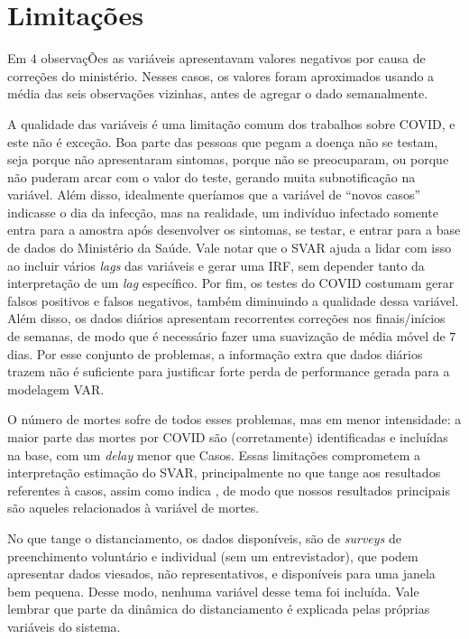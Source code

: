 \documentclass[
    article,
	12pt,				%
	oneside,			%
	a4paper,			%
	english,			%
	brazil,				%
	hyperref = {colorlinks, citecolor=c1d, linkcolor=c2d, urlcolor=c3d, colorlinks}
	]{abntex2}
\newcounter{j}
\begin{document}
\section{Limitações}

Em $4$ observaçÕes as variáveis apresentavam valores negativos por causa de correções do ministério. Nesses casos, os valores foram aproximados usando a média das seis observações vizinhas, antes de agregar o dado semanalmente.

A qualidade das variáveis é uma limitação comum dos trabalhos sobre COVID, e este não é exceção. Boa parte das pessoas que pegam a doença não se testam, seja porque não apresentaram sintomas, porque não se preocuparam, ou porque não puderam arcar com o valor do teste, gerando muita subnotificação na variável. Além disso, idealmente queríamos que a variável de ``novos casos'' indicasse o dia da infecção, mas na realidade, um indivíduo infectado somente entra para a amostra após desenvolver os sintomas, se testar, e entrar para a base de dados do Ministério da Saúde. Vale notar que o SVAR ajuda a lidar com isso ao incluir vários \textit{lags} das variáveis e gerar uma IRF, sem depender tanto da interpretação de um \textit{lag} específico. Por fim, os testes do COVID costumam gerar falsos positivos e falsos negativos, também diminuindo a qualidade dessa variável. Além disso, os dados diários apresentam recorrentes correções nos finais/inícios de semanas, de modo que é necessário fazer uma suavização de média móvel de $7$ dias. Por esse conjunto de problemas, a informação extra que dados diários trazem não é suficiente para justificar forte perda de performance gerada para a modelagem VAR.

O número de mortes sofre de todos esses problemas, mas em menor intensidade: a maior parte das mortes por COVID são (corretamente) identificadas e incluídas na base, com um \textit{delay} menor que Casos. Essas limitações comprometem a interpretação estimação do SVAR, principalmente no que tange aos resultados referentes à casos, assim como indica \textcite{Escobar2019}, de modo que nossos resultados principais são aqueles relacionados à variável de mortes.

No que tange o distanciamento, os dados disponíveis, são de \textit{surveys} de preenchimento voluntário e individual (sem um entrevistador), que podem apresentar dados viesados, não representativos, e disponíveis para uma janela bem pequena. Desse modo, nenhuma variável desse tema foi incluída. Vale lembrar que parte da dinâmica do distanciamento é explicada pelas próprias variáveis do sistema.
\end{document}
